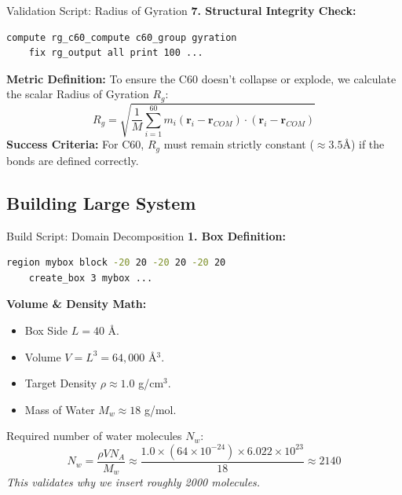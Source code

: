 \documentclass[aspectratio=169, 10pt]{beamer}
\begin{document}
\begin{frame}[fragile]{Validation Script: Radius of Gyration}
    \textbf{7. Structural Integrity Check:}
    \begin{lstlisting}[language=bash]
    compute rg_c60_compute c60_group gyration
    fix rg_output all print 100 ...
    \end{lstlisting}

    \textbf{Metric Definition:}
    To ensure the C60 doesn't collapse or explode, we calculate the scalar Radius of Gyration $R_g$:
    \begin{equation}
        R_g = \sqrt{ \frac{1}{M} \sum_{i=1}^{60} m_i (\mathbf{r}_i - \mathbf{r}_{COM}) \cdot (\mathbf{r}_i - \mathbf{r}_{COM}) }
    \end{equation}
    \textbf{Success Criteria:} For C60, $R_g$ must remain strictly constant ($\approx 3.5$\AA) if the bonds are defined correctly.
\end{frame}

\subsection{Building Large System}

\begin{frame}[fragile]{Build Script: Domain Decomposition}
    \textbf{1. Box Definition:}
    \begin{lstlisting}[language=bash]
    region mybox block -20 20 -20 20 -20 20
    create_box 3 mybox ...
    \end{lstlisting}
    
    \textbf{Volume \& Density Math:}
    \begin{itemize}
        \item Box Side $L = 40$ \AA.
        \item Volume $V = L^3 = 64,000$ \AA$^3$.
        \item Target Density $\rho \approx 1.0$ g/cm$^3$.
        \item Mass of Water $M_w \approx 18$ g/mol.
    \end{itemize}
    Required number of water molecules $N_w$:
    \begin{equation}
        N_w = \frac{\rho V N_A}{M_w} \approx \frac{1.0 \times (64\times 10^{-24}) \times 6.022\times 10^{23}}{18} \approx 2140
    \end{equation}
    \textit{This validates why we insert roughly 2000 molecules.}
\end{frame}
\end{document}
